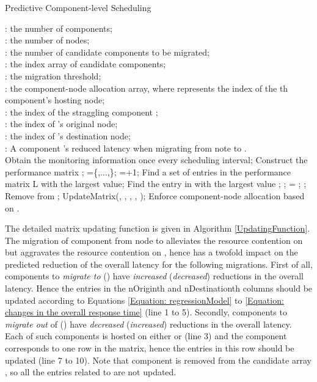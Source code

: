 \documentclass[10pt, conference, compsocconf]{IEEEtran}
\begin{document}
\begin{algorithm}[htbp]
\caption{Predictive Component-level Scheduling}
\label{SchedulingAlgorithm}
\begin{algorithmic}[1]
\REQUIRE : the number of components;\\
: the number of nodes;\\
: the number of candidate components to be migrated;\\
: the index array of candidate components; \\
: the migration threshold; \\
: the component-node allocation array, where  represents the index of the th component's hosting node; \\
: the index of the straggling component ;\\
: the index of 's original node;\\
: the index of 's destination node;\\
: A component 's reduced latency when migrating from note  to .\\

\STATE Obtain the monitoring information once every scheduling interval;
\STATE Construct the performance matrix ;
\STATE =\{,...,\};
\STATE =+1;
\STATE Find a set of entries  in the performance matrix L with the largest value;
    \STATE Find the entry  in  with the largest value ;
\STATE ;
    \IF{()}
        \STATE  = ;
        \STATE ; \STATE Remove  from ;
        \STATE UpdateMatrix(, , , , );
    \ENDIF
\ENDWHILE
\STATE Enforce component-node allocation based on .
\end{algorithmic}
\end{algorithm}

The detailed matrix updating function is given in Algorithm \ref{UpdatingFunction}. The migration of component  from node  to  alleviates the resource contention on  but aggravates the resource contention on , hence has a twofold impact on the predicted reduction of the overall latency for the following migrations. First of all, components to \emph{migrate to}  () have \emph{increased} (\emph{decreased}) reductions in the overall latency. Hence the entries in the nOriginth and nDestinationth columns should be updated according to Equations \ref{Equation: regressionModel} to \ref{Equation: changes in the overall response time} (line 1 to 5). Secondly, components to \emph{migrate out} of  () have \emph{decreased} (\emph{increased}) reductions in the overall latency. Each of such components is hosted on either  or  (line 3) and the component corresponds to one row in the matrix, hence the entries in this row should be updated (line 7 to 10). Note that component  is removed from the candidate array , so all the entries related to  are not updated.
\end{document}

